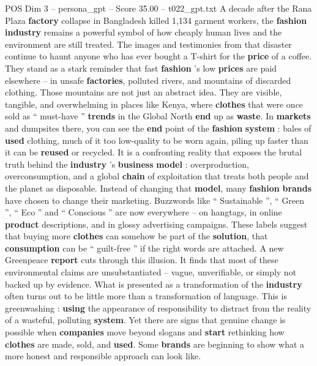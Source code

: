 \begin{textsample}{POS Dim 3 – persona\_gpt – Score 35.00 – t022\_gpt.txt}  \label{ex:f3_pos_021}
A decade after the Rana Plaza \textbf{factory} collapse in Bangladesh killed 1,134 garment workers, the \textbf{fashion} \textbf{industry} remains a powerful symbol of how cheaply human lives and the environment are still treated.
The images and testimonies from that disaster continue to haunt anyone who has ever bought a T-shirt for the \textbf{price} of a coffee.
They stand as a stark reminder that fast \textbf{fashion} ’s low \textbf{prices} are paid elsewhere – in unsafe \textbf{factories}, polluted rivers, and mountains of discarded clothing.
Those mountains are not just an abstract idea.
They are visible, tangible, and overwhelming in places like Kenya, where \textbf{clothes} that were once sold as “ must-have ” \textbf{trends} in the Global North \textbf{end} up as \textbf{waste}.
In \textbf{markets} and dumpsites there, you can see the \textbf{end} point of the \textbf{fashion} \textbf{system} : bales of \textbf{used} clothing, much of it too low-quality to be worn again, piling up faster than it can be \textbf{reused} or recycled.
It is a confronting reality that exposes the brutal truth behind the \textbf{industry} ’s \textbf{business} \textbf{model} : overproduction, overconsumption, and a global \textbf{chain} of exploitation that treats both people and the planet as disposable.
Instead of changing that \textbf{model}, many \textbf{fashion} \textbf{brands} have chosen to change their marketing.
Buzzwords like “ Sustainable ”, “ Green ”, “ Eco ” and “ Conscious ” are now everywhere – on hangtags, in online \textbf{product} descriptions, and in glossy advertising campaigns.
These labels suggest that buying more \textbf{clothes} can somehow be part of the \textbf{solution}, that \textbf{consumption} can be “ guilt-free ” if the right words are attached.
A new Greenpeace \textbf{report} cuts through this illusion.
It finds that most of these environmental claims are unsubstantiated – vague, unverifiable, or simply not backed up by evidence.
What is presented as a transformation of the \textbf{industry} often turns out to be little more than a transformation of language.
This is greenwashing : \textbf{using} the appearance of responsibility to distract from the reality of a wasteful, polluting \textbf{system}.
Yet there are signs that genuine change is possible when \textbf{companies} move beyond slogans and \textbf{start} rethinking how \textbf{clothes} are made, sold, and \textbf{used}.
Some \textbf{brands} are beginning to show what a more honest and responsible approach can look like.

\end{textsample}
